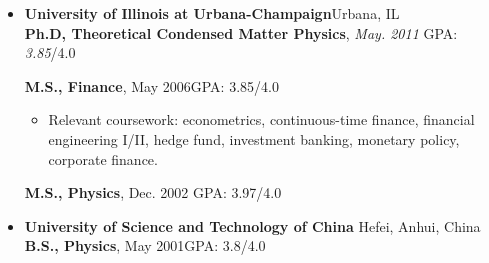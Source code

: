 \documentclass[9.5pt]{article}
\begin{document}
	\begin{itemize}
	\item[] \textbf{University of Illinois at Urbana-Champaign}{\hfill}Urbana, IL \\
	\vspace{1ex}
		\textbf{ Ph.D,  Theoretical Condensed Matter Physics}, \emph{May. 2011} {\hfill}GPA: \emph{3.85}/4.0\\		 
		\textbf{ M.S., Finance}, {May 2006}\hfill GPA: {3.85}/4.0\\

	 \begin{itemize}
	 \item Relevant coursework: {econometrics, continuous-time finance, financial engineering I/II, hedge fund, investment banking, monetary policy, corporate finance}.
		\end{itemize}

	\textbf{ M.S., Physics}, Dec. 2002{\hfill} GPA: 3.97/4.0\\
	\vspace{0.1in}
  \item[]\textbf{University of Science and Technology of China}{\hfill} Hefei, Anhui, China\\
		\textbf{ B.S., Physics}, May 2001{\hfill}GPA: 3.8/4.0
	\end{itemize}
\end{document}

